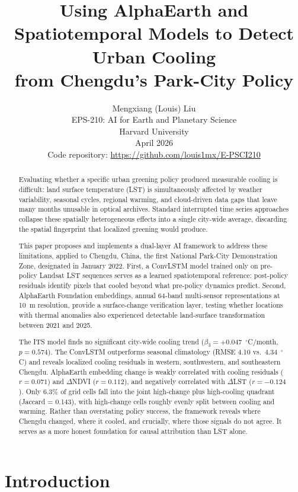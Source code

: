 \documentclass{article}
\title{Using AlphaEarth and Spatiotemporal Models to Detect Urban Cooling\\
from Chengdu's Park-City Policy}
\author{%
  Mengxiang (Louis) Liu \\
  EPS-210: AI for Earth and Planetary Science \\
  Harvard University \\
  April 2026 \\
  \small Code repository: \url{https://github.com/louis1mx/E-PSCI210}
}
\begin{document}
\maketitle

\begin{abstract}
Evaluating whether a specific urban greening policy produced measurable cooling
is difficult: land surface temperature (LST) is simultaneously affected by
weather variability, seasonal cycles, regional warming, and cloud-driven data
gaps that leave many months unusable in optical archives. Standard interrupted
time series approaches collapse these spatially heterogeneous effects into a
single city-wide average, discarding the spatial fingerprint that localized
greening would produce.

This paper proposes and implements a dual-layer AI framework to address these
limitations, applied to Chengdu, China, the first National Park-City
Demonstration Zone, designated in January 2022. First, a ConvLSTM model
trained only on pre-policy Landsat LST sequences serves as a learned
spatiotemporal reference: post-policy residuals identify pixels that cooled
beyond what pre-policy dynamics predict. Second, AlphaEarth Foundation
embeddings, annual 64-band multi-sensor representations at 10~m resolution, provide a surface-change verification layer, testing whether locations with
thermal anomalies also experienced detectable land-surface transformation
between 2021 and 2025.

The ITS model finds no significant city-wide cooling trend
($\beta_3 = +0.047$~$^\circ$C/month, $p = 0.574$). The ConvLSTM outperforms
seasonal climatology (RMSE 4.10 vs.\ 4.34~$^\circ$C) and reveals localized
cooling residuals in western, southwestern, and southeastern Chengdu. AlphaEarth embedding
change is weakly correlated with cooling residuals ($r = 0.071$) and
$\Delta$NDVI ($r = 0.112$), and negatively correlated with $\Delta$LST
($r = -0.124$). Only 6.3\% of grid cells fall into the joint high-change plus
high-cooling quadrant (Jaccard = 0.143), with high-change cells roughly evenly
split between cooling and warming. Rather than overstating policy success, the
framework reveals where Chengdu changed, where it cooled, and crucially, where
those signals do not agree. It serves as a more honest foundation for causal attribution
than LST alone.
\end{abstract}

\section{Introduction}
\label{sec:intro}
\end{document}
